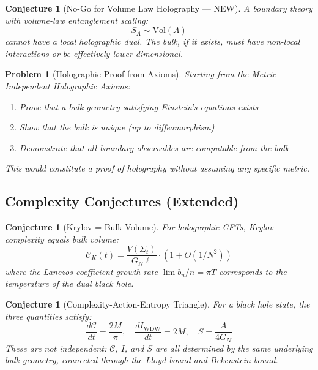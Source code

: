 \documentclass[12pt,a4paper]{article}
\newtheorem{conjecture}[theorem]{Conjecture}
\newtheorem{problem}[theorem]{Problem}
\begin{document}
\begin{conjecture}[No-Go for Volume Law Holography --- NEW]
A boundary theory with volume-law entanglement scaling:
\begin{equation}
S_A \sim \text{Vol}(A)
\end{equation}
cannot have a local holographic dual. The bulk, if it exists, must have non-local interactions or be effectively lower-dimensional.
\end{conjecture}

\begin{problem}[Holographic Proof from Axioms]
Starting from the Metric-Independent Holographic Axioms:
\begin{enumerate}
    \item Prove that a bulk geometry satisfying Einstein's equations exists
    \item Show that the bulk is unique (up to diffeomorphism)
    \item Demonstrate that all boundary observables are computable from the bulk
\end{enumerate}
This would constitute a proof of holography without assuming any specific metric.
\end{problem}

\subsection{Complexity Conjectures (Extended)}

\begin{conjecture}[Krylov = Bulk Volume]
For holographic CFTs, Krylov complexity equals bulk volume:
\begin{equation}
\mathcal{C}_K(t) = \frac{V(\Sigma_t)}{G_N \ell} \cdot (1 + O(1/N^2))
\end{equation}
where the Lanczos coefficient growth rate $\lim b_n/n = \pi T$ corresponds to the temperature of the dual black hole.
\end{conjecture}

\begin{conjecture}[Complexity-Action-Entropy Triangle]
For a black hole state, the three quantities satisfy:
\begin{equation}
\frac{d\mathcal{C}}{dt} = \frac{2M}{\pi}, \quad \frac{dI_{\text{WDW}}}{dt} = 2M, \quad S = \frac{A}{4G_N}
\end{equation}
These are not independent: $\mathcal{C}$, $I$, and $S$ are all determined by the same underlying bulk geometry, connected through the Lloyd bound and Bekenstein bound.
\end{conjecture}
\end{document}
